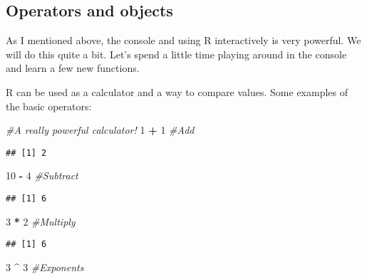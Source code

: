 \documentclass[]{article}
\newenvironment{Shaded}{\begin{snugshade}}{\end{snugshade}}
\newcommand{\CommentTok}[1]{\textcolor[rgb]{0.56,0.35,0.01}{\textit{#1}}}
\newcommand{\DecValTok}[1]{\textcolor[rgb]{0.00,0.00,0.81}{#1}}
\newcommand{\OperatorTok}[1]{\textcolor[rgb]{0.81,0.36,0.00}{\textbf{#1}}}
\newcommand{\StringTok}[1]{\textcolor[rgb]{0.31,0.60,0.02}{#1}}
\begin{document}
\hypertarget{operators-and-objects}{%
\subsection{Operators and objects}\label{operators-and-objects}}

As I mentioned above, the console and using R interactively is very
powerful. We will do this quite a bit. Let's spend a little time playing
around in the console and learn a few new functions.

R can be used as a calculator and a way to compare values. Some examples
of the basic operators:

\begin{Shaded}
\begin{Highlighting}[]
\CommentTok{#A really powerful calculator!}
\DecValTok{1} \OperatorTok{+}\StringTok{ }\DecValTok{1} \CommentTok{#Add}
\end{Highlighting}
\end{Shaded}

\begin{verbatim}
## [1] 2
\end{verbatim}

\begin{Shaded}
\begin{Highlighting}[]
\DecValTok{10} \OperatorTok{-}\StringTok{ }\DecValTok{4} \CommentTok{#Subtract}
\end{Highlighting}
\end{Shaded}

\begin{verbatim}
## [1] 6
\end{verbatim}

\begin{Shaded}
\begin{Highlighting}[]
\DecValTok{3} \OperatorTok{*}\StringTok{ }\DecValTok{2} \CommentTok{#Multiply}
\end{Highlighting}
\end{Shaded}

\begin{verbatim}
## [1] 6
\end{verbatim}

\begin{Shaded}
\begin{Highlighting}[]
\DecValTok{3} \OperatorTok{^}\StringTok{ }\DecValTok{3} \CommentTok{#Exponents}
\end{Highlighting}
\end{Shaded}
\end{document}

